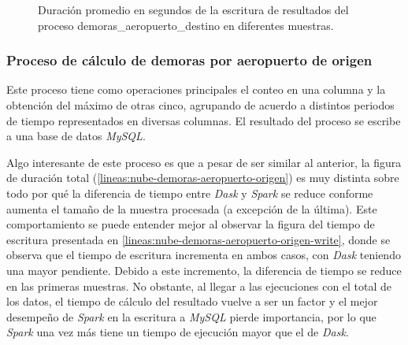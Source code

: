 \begin{figure}
\centering
{}
\caption{Duración promedio en segundos de la escritura de resultados del proceso demoras\_aeropuerto\_destino en diferentes muestras.}
\label{lineas:nube-demoras-aeropuerto-destino-write}
\end{figure}

\subsubsection{Proceso de cálculo de demoras por aeropuerto de origen}

Este proceso tiene como operaciones principales el conteo en una columna y la obtención del máximo de otras cinco, agrupando de acuerdo a distintos periodos de tiempo representados en diversas columnas. El resultado del proceso se escribe a una base de datos \textit{MySQL}.

Algo interesante de este proceso es que a pesar de ser similar al anterior, la figura de duración total (\ref{lineas:nube-demoras-aeropuerto-origen}) es muy distinta sobre todo por qué la diferencia de tiempo entre \textit{Dask} y \textit{Spark} se reduce conforme aumenta el tamaño de la muestra procesada (a excepción de la última). Este comportamiento se puede entender mejor al observar la figura del tiempo de escritura presentada en \ref{lineas:nube-demoras-aeropuerto-origen-write}, donde se observa que el tiempo de escritura incrementa en ambos casos, con \textit{Dask} teniendo una mayor pendiente. Debido a este incremento, la diferencia de tiempo se reduce en las primeras muestras. No obstante, al llegar a las ejecuciones con el total de los datos, el tiempo de cálculo del resultado vuelve a ser un factor y el mejor desempeño de \textit{Spark} en la escritura a \textit{MySQL} pierde importancia, por lo que \textit{Spark} una vez más tiene un tiempo de ejecución mayor que el de \textit{Dask}.


